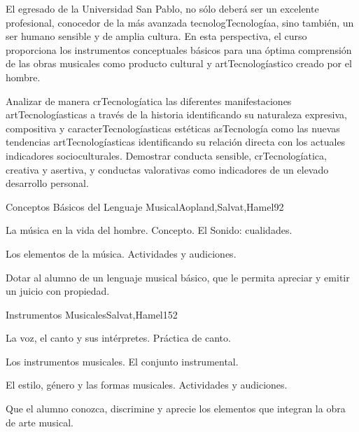 \begin{syllabus}


\begin{justification}
El egresado de la Universidad San Pablo, no sólo deberá ser un excelente profesional, conocedor de la más avanzada tecnologTecnologíaa, sino también, un ser humano sensible y de amplia cultura. En esta perspectiva, el curso proporciona los instrumentos conceptuales básicos para una óptima comprensión de las obras musicales como producto cultural y artTecnologíastico creado por el hombre.
\end{justification}

\begin{goals}
\item Analizar de manera crTecnologíatica las diferentes manifestaciones artTecnologíasticas a través de la historia identificando su naturaleza expresiva, compositiva y caracterTecnologíasticas estéticas asTecnología como las nuevas tendencias artTecnologíasticas identificando su relación directa con los actuales indicadores socioculturales. Demostrar conducta sensible, crTecnologíatica, creativa y asertiva, y conductas valorativas como indicadores de un elevado desarrollo personal.
\end{goals}

\begin{outcomes}
\end{outcomes}

\begin{unit}{Conceptos Básicos del Lenguaje Musical}{Aopland,Salvat,Hamel}{9}{2}
\begin{topics}
	\item La música en la vida del hombre. Concepto. El Sonido: cualidades.
	\item Los elementos de la música. Actividades y audiciones.
\end{topics}
\begin{learningoutcomes}
	\item Dotar al alumno de un lenguaje musical básico, que le permita apreciar y emitir un juicio con propiedad.
\end{learningoutcomes}
\end{unit}

\begin{unit}{Instrumentos Musicales}{Salvat,Hamel}{15}{2}
\begin{topics}
	\item La voz, el canto y sus intérpretes. Práctica de canto.
	\item Los instrumentos musicales. El conjunto instrumental.
	\item El estilo, género y las formas musicales. Actividades y audiciones.
\end{topics}
\begin{learningoutcomes}
	\item Que el alumno conozca, discrimine y aprecie los elementos que integran la obra de arte musical.
\end{learningoutcomes}
\end{unit}


\end{syllabus}

